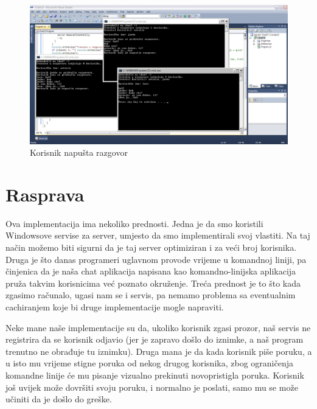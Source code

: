 \documentclass[10pt,a4paper,onecolumn,titlepage]{article}
\begin{document}
\begin{figure}[!ht]
\begin{minipage}{\textwidth}
\centering
\includegraphics[width=\textwidth]{images/leaving_notification.jpg}
\caption{Korisnik napušta razgovor}
\end{minipage}
\end{figure}

\section{Rasprava}

Ova implementacija ima nekoliko prednosti. Jedna je da smo koristili Windowsove
servise za server, umjesto da smo implementirali svoj vlastiti. Na taj način
možemo biti sigurni da je taj server optimiziran i za veći broj korisnika.
Druga je što danas programeri uglavnom provode vrijeme u komandnoj liniji,
pa činjenica da je naša chat aplikacija napisana kao komandno-linijska aplikacija
pruža takvim korisnicima već poznato okruženje. Treća prednost je to što kada
zgasimo računalo, ugasi nam se i servis, pa nemamo problema sa eventualnim
cachiranjem koje bi druge implementacije mogle napraviti.

Neke mane naše implementacije su da, ukoliko korisnik zgasi prozor, naš servis
ne registrira da se korisnik odjavio (jer je zapravo došlo do iznimke, a naš
program trenutno ne obrađuje tu iznimku). Druga mana je da kada korisnik
piše poruku, a u isto mu vrijeme stigne poruka od nekog drugog korisnika,
zbog ograničenja komandne linije će mu pisanje vizualno prekinuti novopristigla
poruka. Korisnik još uvijek može dovršiti svoju poruku, i normalno je poslati,
samo mu se može učiniti da je došlo do greške.
\end{document}
